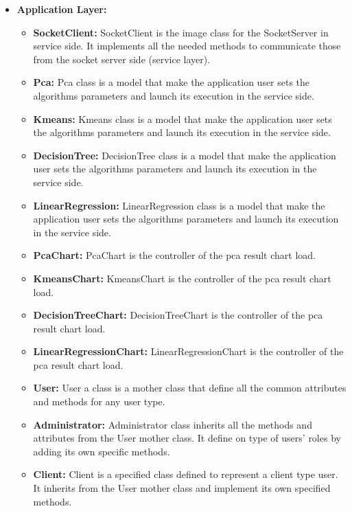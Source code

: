 \begin{itemize}
\item \textbf{Application Layer:}\\
\begin{itemize}
\item \textbf{SocketClient:} SocketClient is the image class for the SocketServer in service side. It implements all the needed methods to communicate those from the socket server side (service layer).\\
\item \textbf{Pca:} Pca class is a model that make the application user sets the algorithms parameters and launch its execution in the service side.\\
\item \textbf{Kmeans:} Kmeans class is a model that make the application user sets the algorithms parameters and launch its execution in the service side.\\
\item \textbf{DecisionTree:} DecisionTree class is a model that make the application user sets the algorithms parameters and launch its execution in the service side.\\
\item \textbf{LinearRegression:} LinearRegression class is a model that make the application user sets the algorithms parameters and launch its execution in the service side.\\
\item \textbf{PcaChart:} PcaChart is the controller of the pca result chart load.\\
\item \textbf{KmeansChart:} KmeansChart is the controller of the pca result chart load.\\
\item \textbf{DecisionTreeChart:}  DecisionTreeChart is the controller of the pca result chart load.\\
\item \textbf{LinearRegressionChart:}  LinearRegressionChart is the controller of the pca result chart load.\\
\item \textbf{User:} User a class is a mother class that define all the common attributes and methods for any user type.\\
\item \textbf{Administrator:} Administrator class inherits all the methods and attributes from the User mother class. It define on type of users' roles by adding its own specific methods.\\
\item \textbf{Client:} Client is a specified class defined to represent a client type user. It inherits from the User mother class and implement its own specified methods.\\
\end{itemize}
\end{itemize} 


